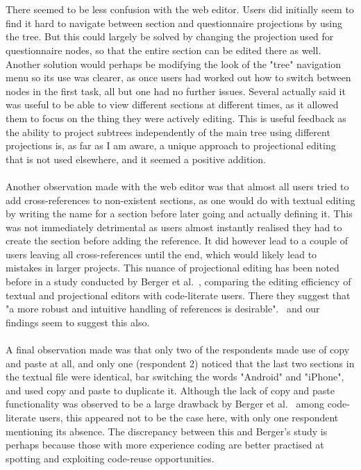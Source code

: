 \documentclass{article}
\begin{document}
{\\
\\
There seemed to be less confusion with the web editor. Users did initially seem to find it hard to navigate between section and questionnaire projections by using the tree. But this could largely be solved by changing the projection used for questionnaire nodes, so that the entire section can be edited there as well. Another solution would perhaps be modifying the look of the "tree" navigation menu so its use was clearer, as once users had worked out how to switch between nodes in the first task, all but one had no further issues. Several actually said it was useful to be able to view different sections at different times, as it allowed them to focus on the thing they were actively editing. This is useful feedback as the ability to project subtrees independently of the main tree using different projections is, as far as I am aware, a unique approach to projectional editing that is not used elsewhere, and it seemed a positive addition.
\\
\\
Another observation made with the web editor was that almost all users tried to add cross-references to non-existent sections, as one would do with textual editing by writing the name for a section before later going and actually defining it. This was not immediately detrimental as users almost instantly realised they had to create the section before adding the reference. It did however lead to a couple of users leaving all cross-references until the end, which would likely lead to mistakes in larger projects. This nuance of projectional editing has been noted before in a study conducted by Berger et al.~\cite{projEditControlledExperiment}, comparing the editing efficiency of textual and projectional editors with code-literate users. There they suggest that "a more robust and intuitive handling of references is desirable".~\cite[pg. 9]{projEditControlledExperiment} and our findings seem to suggest this also.
\\
\\
A final observation made was that only two of the respondents made use of copy and paste at all, and only one (respondent 2) noticed that the last two sections in the textual file were identical, bar switching the words "Android" and "iPhone", and used copy and paste to duplicate it. Although the lack of copy and paste functionality was observed to be a large drawback by Berger et al.~\cite{projEditControlledExperiment} among code-literate users, this appeared not to be the case here, with only one respondent mentioning its absence. The discrepancy between this and Berger's study is perhaps because those with more experience coding are better practised at spotting and exploiting code-reuse opportunities.

}
\end{document}

